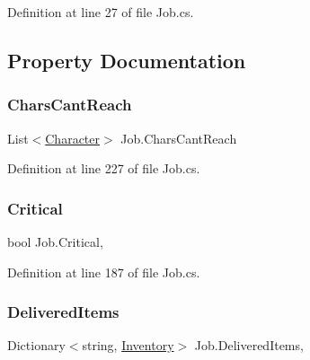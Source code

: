 Definition at line 27 of file Job.\+cs.



\subsection{Property Documentation}
\mbox{\label{class_job_a24dca863667c9abc692568e7cbeac981}} 
\subsubsection{\texorpdfstring{Chars\+Cant\+Reach}{CharsCantReach}}
{\footnotesize\ttfamily List$<$\hyperlink{class_project_porcupine_1_1_entities_1_1_character}{Character}$>$ Job.\+Chars\+Cant\+Reach\hspace{0.3cm}{\ttfamily [get]}}



Definition at line 227 of file Job.\+cs.

\mbox{\label{class_job_addc4cd9d9fbf1a6faa155fae581b72b2}} 
\subsubsection{\texorpdfstring{Critical}{Critical}}
{\footnotesize\ttfamily bool Job.\+Critical\hspace{0.3cm}{\ttfamily [get]}, {}}



Definition at line 187 of file Job.\+cs.

\mbox{\label{class_job_a0ce910378be270a7b858139a3f7dac5e}} 
\subsubsection{\texorpdfstring{Delivered\+Items}{DeliveredItems}}
{\footnotesize\ttfamily Dictionary$<$string, \hyperlink{class_inventory}{Inventory}$>$ Job.\+Delivered\+Items\hspace{0.3cm}{\ttfamily [get]}, {\ttfamily [set]}}



